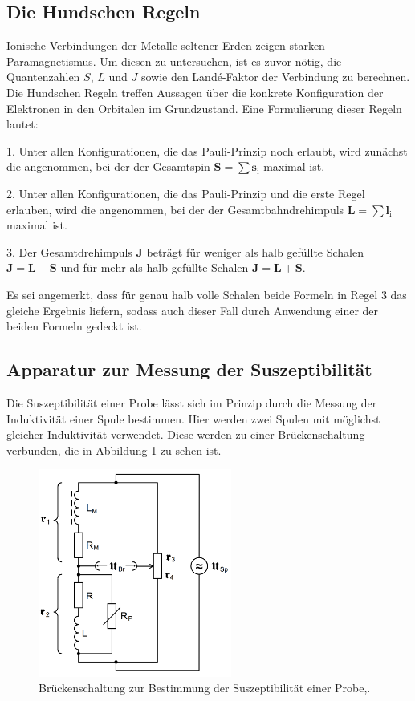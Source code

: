 \subsection{Die Hundschen Regeln}
\label{subsec:hundscheregeln}
Ionische Verbindungen der Metalle seltener Erden zeigen starken Paramagnetismus.
Um diesen zu untersuchen, ist es zuvor nötig, die Quantenzahlen $S$, $L$ und $J$ sowie
den Landé-Faktor der Verbindung zu berechnen. Die Hundschen Regeln treffen Aussagen
über die konkrete Konfiguration der Elektronen in den Orbitalen im Grundzustand.
Eine Formulierung dieser Regeln lautet:

1. Unter allen Konfigurationen, die das Pauli-Prinzip noch erlaubt, wird zunächst die
angenommen, bei der der Gesamtspin $\symbf{S} = \sum \symbf{s}_{\text{i}}$ maximal ist.

2. Unter allen Konfigurationen, die das Pauli-Prinzip und die erste Regel erlauben, wird
die angenommen, bei der der Gesamtbahndrehimpuls $\symbf{L} = \sum \symbf{l}_{\text{i}}$
maximal ist.

3. Der Gesamtdrehimpuls $\symbf{J}$ beträgt für weniger als halb gefüllte Schalen
$\symbf{J} = \symbf{L} - \symbf{S}$ und für mehr als halb gefüllte Schalen
$\symbf{J} = \symbf{L} + \symbf{S}$.

Es sei angemerkt, dass für genau halb volle Schalen beide Formeln in Regel 3 das gleiche
Ergebnis liefern, sodass auch dieser Fall durch Anwendung einer der beiden Formeln
gedeckt ist.

\subsection{Apparatur zur Messung der Suszeptibilität}
\label{subsec:apparatur}

Die Suszeptibilität einer Probe lässt sich im Prinzip durch die Messung
der Induktivität einer Spule bestimmen. Hier werden zwei Spulen mit möglichst gleicher
Induktivität verwendet. Diese werden zu einer Brückenschaltung verbunden, die in Abbildung
\ref{fig:brueckenschaltung} zu sehen ist.

\begin{figure}
  \centering
  \includegraphics[width=180pt]{data/bruecke.png}
  \caption{Brückenschaltung zur Bestimmung der Suszeptibilität einer Probe,\cite{Versuchsanleitung}.}
  \label{fig:brueckenschaltung}
\end{figure}

